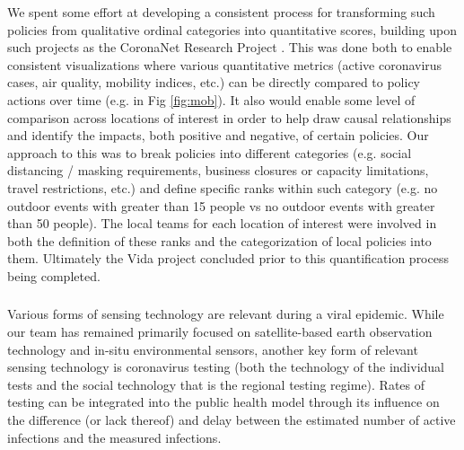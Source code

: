 We spent some effort at developing a consistent process for transforming such policies from qualitative ordinal categories into quantitative scores, building upon such projects as the CoronaNet Research Project \cite{CoronaNetResearchProject}. This was done both to enable consistent visualizations where various quantitative metrics (active coronavirus cases, air quality, mobility indices, etc.) can be directly compared to policy actions over time (e.g. in Fig \ref{fig:mob}). It also would enable some level of comparison across locations of interest in order to help draw causal relationships and identify the impacts, both positive and negative, of certain policies. Our approach to this was to break policies into different categories (e.g. social distancing / masking requirements, business closures or capacity limitations, travel restrictions, etc.) and define specific ranks within such category (e.g. no outdoor events with greater than 15 people vs no outdoor events with greater than 50 people). The local teams for each location of interest were involved in both the definition of these ranks and the categorization of local policies into them. Ultimately the Vida project concluded prior to this quantification process being completed.  

\subsubsection{}

Various forms of sensing technology are relevant during a viral epidemic. While our team has remained primarily focused on satellite-based earth observation technology and in-situ environmental sensors, another key form of relevant sensing technology is coronavirus testing (both the technology of the individual tests and the social technology that is the regional testing regime). Rates of testing can be integrated into the public health model through its influence on the difference (or lack thereof) and delay between the estimated number of active infections and the measured infections.

\subsection{} \label{sec:vida-evdt-result}

\subsubsection{} \label{sec:vida-evdt-e-result}

